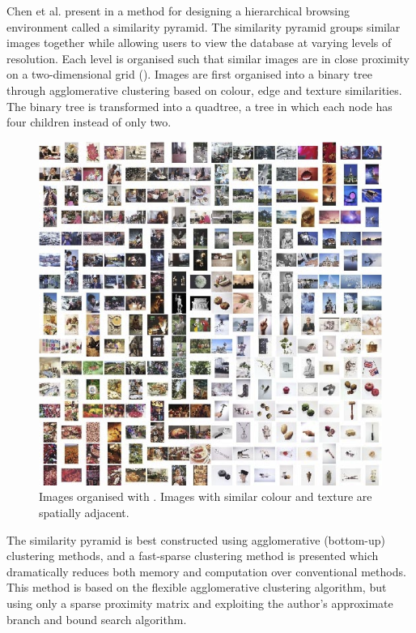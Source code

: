 Chen et al. present in \cite{Chen:1998p2344} a method for designing a hierarchical browsing environment called a similarity pyramid. The similarity pyramid groups similar images together while allowing users to view the database at varying levels of resolution. Each level is organised such that similar images are in close proximity on a two-dimensional grid (). Images are first organised into a binary tree through agglomerative clustering based on colour, edge and texture similarities. The binary tree is transformed into a quadtree, a tree in which each node has four children instead of only two.

\begin{figure}[ht]
	\centering
		\includegraphics[scale=0.8]{imgs/Chen-1998p2344.png}
	\caption{Images organised with \cite{Chen:1998p2344}. Images with similar colour and texture are spatially adjacent.}
	\label{fig:Chen1}
\end{figure}

The similarity pyramid is best constructed using agglomerative (bottom-up) clustering methods, and a fast-sparse clustering method is presented which dramatically reduces both memory and computation over conventional methods. This method is based on the flexible agglomerative clustering algorithm, but using only a sparse proximity matrix and exploiting the author's approximate branch and bound search algorithm.

